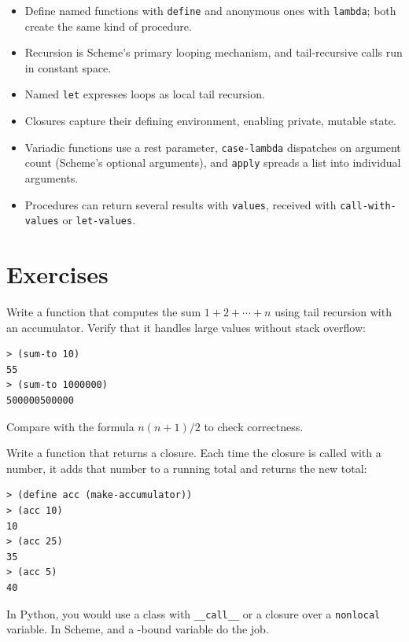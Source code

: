 \begin{itemize}
    \item Define named functions with \texttt{define} and anonymous ones with \texttt{lambda}; both create the same kind of procedure.
    \item Recursion is Scheme's primary looping mechanism, and tail-recursive calls run in constant space.
    \item Named \texttt{let} expresses loops as local tail recursion.
    \item Closures capture their defining environment, enabling private, mutable state.
    \item Variadic functions use a rest parameter, \texttt{case-lambda} dispatches on argument count (Scheme's optional arguments), and \texttt{apply} spreads a list into individual arguments.
    \item Procedures can return several results with \texttt{values}, received with \texttt{call-with-values} or \texttt{let-values}.
\end{itemize}

\section*{Exercises}

\begin{exercise}
Write a function  that computes the sum $1 + 2 + \cdots + n$ using tail recursion with an accumulator. Verify that it handles large values without stack overflow:

\begin{lstlisting}[style=repl]
> (sum-to 10)
55
> (sum-to 1000000)
500000500000
\end{lstlisting}

Compare with the formula $n(n+1)/2$ to check correctness.
\end{exercise}

\begin{exercise}
Write a function  that returns a closure. Each time the closure is called with a number, it adds that number to a running total and returns the new total:

\begin{lstlisting}[style=repl]
> (define acc (make-accumulator))
> (acc 10)
10
> (acc 25)
35
> (acc 5)
40
\end{lstlisting}

In Python, you would use a class with \texttt{\_\_call\_\_} or a closure over a \texttt{nonlocal} variable. In Scheme,  and a -bound variable do the job.
\end{exercise}

